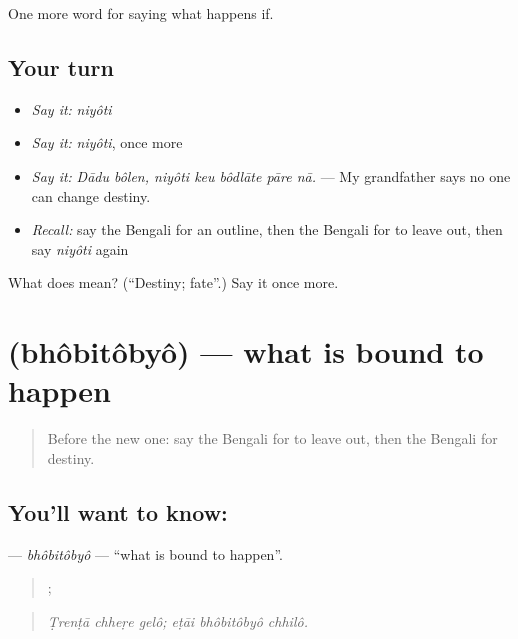 \begin{grammarlens}[title={What you've built}]
One more word for saying what happens if.
\end{grammarlens}

\subsection*{Your turn}
\begin{itemize}
\raggedright
  \item \emph{Say it:} \emph{niyôti}
  \item \emph{Say it:} \emph{niyôti}, once more
  \item \emph{Say it:} \emph{Dādu bôlen, niyôti keu bôdlāte pāre nā.} — My grandfather says no one can change destiny.
  \item \emph{Recall:} say the Bengali for an outline, then the Bengali for to leave out, then say \emph{niyôti} again
\end{itemize}

\begin{tcolorbox}[breakable,colback=teal!4,colframe=teal!35!black,title={Before you move on}]
What does  mean? (\textquotedblleft{}Destiny; fate\textquotedblright{}.) Say it once more.
\end{tcolorbox}
\section[\texorpdfstring{\bn{ভবিতব্য} (bhôbitôbyô)}{ভবিতব্য (bhôbitôbyô)}]{ (bhôbitôbyô) — what is bound to happen}

\label{lesson:BN-C532-bhobitobyo}



\begin{quote}
Before the new one: say the Bengali for to leave out, then the Bengali for destiny.
\end{quote}

\subsection*{You'll want to know: }
\textbf{} — \emph{bhôbitôbyô} — \textquotedblleft{}what is bound to happen\textquotedblright{}.

\begin{quote}
  ;   
\end{quote}

\begin{quote}
\emph{Ṭrenṭā chheṛe gelô; eṭāi bhôbitôbyô chhilô.}
\end{quote}

